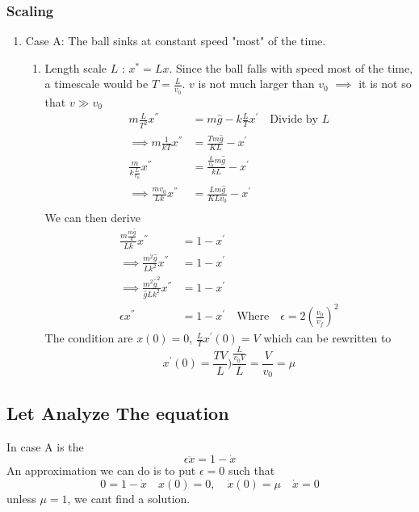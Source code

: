 \documentclass{article}
\theoremstyle{remark}
\begin{document}
   \subsubsection{Scaling}%
   \label{ssub:scaling}
   
   \begin{enumerate}
     \item Case A:  The ball sinks at constant speed "most" of the time.
       \begin{enumerate}
         \item Length scale $L$ : $x^{*} = L x$. Since the ball falls with speed most of the time, a timescale would be $T = \frac{L}{v_{0}} $. $v$ is not much larger than $v_{0}$ $\implies $ it is not so that $v \gg  v_{0}$
            \[
              \begin{split}
            m \frac{L}{T^2}  x^{''} &=   m \hat{g} - k \frac{L}{T}  x^{'} \quad  \text{Divide by } L \\
           \implies m \frac{1}{kT}  x^{''} &=   \frac{Tm \hat{g}}{KL}  - x^{'}\\
           \frac{m}{k \frac{L}{v_{0}} }  x^{''} &=   \frac{ \frac{k}{v_{0}} m \hat{g}}{kL}  - x^{'} \\
           \implies  \frac{m v_{0}}{Lk}  x^{''} &=   \frac{L m  \hat{g}}{ K L v_{0}}  - x^{ '} \\
              \end{split} 
            \] 
            We can then derive \[
            \begin{split}
              \frac{m \frac{m \hat{g}}{k} }{Lk}  x^{''} &=   1 - x^{'} \\
              \implies  \frac{m^2 \hat{g}}{Lk^2}  x^{''} &=   1- x^{'} \\
              \implies  \frac{m^2 \hat{g}^2}{\hat{g}L k^2 }  x^{''} &=    1 - x^{'}  \\
              \epsilon x ^{''} &=    1- x^{'}  \quad  \text{Where} \quad \epsilon = 2\left( \frac{v_{0}}{v_{f}}  \right)^2  
            \end{split} 
            \] 
            The condition are $x\left( 0 \right) = 0$, $\frac{L}{T}  x^{'} \left( 0 \right) = V$ which can be rewritten to \[
              x^{'} \left( 0 \right) = \frac{T V}{L}  ) \frac{ \frac{L}{ v_{0} V} }{L}  = \frac{V}{v_{0}}  = \mu 
            \] 
       \end{enumerate}
   \end{enumerate}

   \subsection{Let Analyze The equation}%
   \label{sub:let_analyze_the_equation}
   In case A is the  \[
   \epsilon \ddot{x} = 1 - \dot{x} 
   \] 
   An approximation  we can do is to put $\epsilon  = 0$ such that \[
   0 = 1- \dot{x} \quad x\left( 0 \right) = 0,\quad   \dot{x} \left( 0 \right) = \mu  \quad \dot{x} = 0 
   \] 
   unless $\mu = 1$, we cant find a solution.
   
\end{document}
